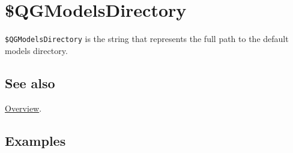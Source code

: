 \documentclass[../FeynHelpersManual.tex]{subfiles}
\begin{document}
\hypertarget{dollarqgmodelsdirectory}{
\section{\$QGModelsDirectory}\label{dollarqgmodelsdirectory}}

\texttt{\$QGModelsDirectory} is the string that represents the full path
to the default models directory.

\subsection{See also}

\hyperlink{toc}{Overview}.

\subsection{Examples}
\end{document}
